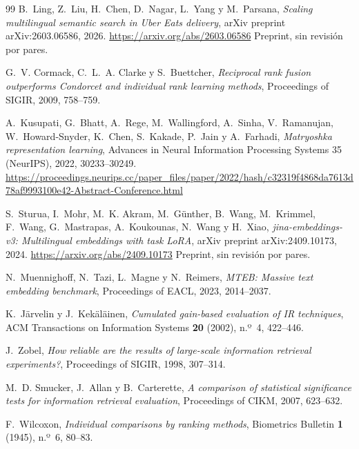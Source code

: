 \documentclass[11pt,letterpaper]{article}
\numberwithin{equation}{section}
\begin{document}
\begin{thebibliography}{99}
B.~Ling, Z.~Liu, H.~Chen, D.~Nagar, L.~Yang y M.~Parsana,
\textit{Scaling multilingual semantic search in Uber Eats delivery},
arXiv preprint arXiv:2603.06586, 2026.
\url{https://arxiv.org/abs/2603.06586} Preprint, sin revisión por pares.

G.~V. Cormack, C.~L.~A. Clarke y S.~Buettcher,
\textit{Reciprocal rank fusion outperforms Condorcet and individual rank learning methods},
Proceedings of SIGIR, 2009, 758--759.

A.~Kusupati, G.~Bhatt, A.~Rege, M.~Wallingford, A.~Sinha, V.~Ramanujan, W.~Howard-Snyder, K.~Chen, S.~Kakade, P.~Jain y A.~Farhadi,
\textit{Matryoshka representation learning},
Advances in Neural Information Processing Systems 35 (NeurIPS), 2022, 30233--30249.
\url{https://proceedings.neurips.cc/paper_files/paper/2022/hash/c32319f4868da7613d78af9993100e42-Abstract-Conference.html}

S.~Sturua, I.~Mohr, M.~K. Akram, M.~G{\"u}nther, B.~Wang, M.~Krimmel, F.~Wang, G.~Mastrapas, A.~Koukounas, N.~Wang y H.~Xiao,
\textit{jina-embeddings-v3: Multilingual embeddings with task LoRA},
arXiv preprint arXiv:2409.10173, 2024.
\url{https://arxiv.org/abs/2409.10173} Preprint, sin revisión por pares.

N.~Muennighoff, N.~Tazi, L.~Magne y N.~Reimers,
\textit{MTEB: Massive text embedding benchmark},
Proceedings of EACL, 2023, 2014--2037.

K.~J{\"a}rvelin y J.~Kek{\"a}l{\"a}inen,
\textit{Cumulated gain-based evaluation of IR techniques},
ACM Transactions on Information Systems \textbf{20} (2002), n.º~4, 422--446.

J.~Zobel,
\textit{How reliable are the results of large-scale information retrieval experiments?},
Proceedings of SIGIR, 1998, 307--314.

M.~D. Smucker, J.~Allan y B.~Carterette,
\textit{A comparison of statistical significance tests for information retrieval evaluation},
Proceedings of CIKM, 2007, 623--632.

F.~Wilcoxon,
\textit{Individual comparisons by ranking methods},
Biometrics Bulletin \textbf{1} (1945), n.º~6, 80--83.


\end{thebibliography}
\end{document}
